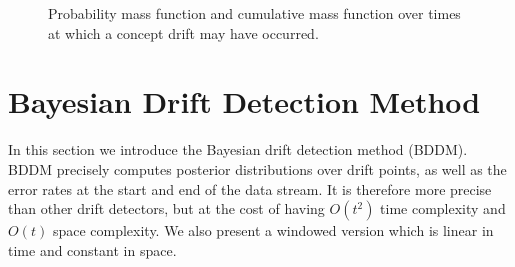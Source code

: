 \begin{figure}
    \centering
    \caption{Probability mass function and cumulative mass function over times at which a concept drift may have occurred.}
    \label{fig:bayes_pdf}
\end{figure}


\section{Bayesian Drift Detection Method} \label{BDD:bddm}

In this section we introduce the Bayesian drift detection method (BDDM). BDDM precisely computes posterior distributions over drift points, as well as the error rates at the start and end of the data stream. It is therefore more precise than other drift detectors, but at the cost of having $O(t^2)$ time complexity and $O(t)$ space complexity. We also present a windowed version which is linear in time and constant in space.

